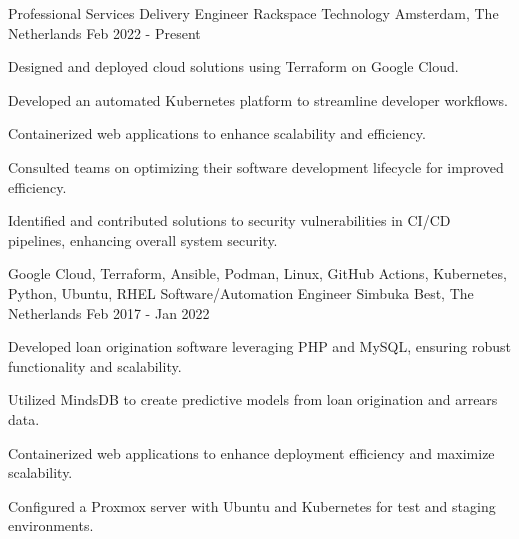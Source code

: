 

\begin{cventries}

  \cventry
    {Professional Services Delivery Engineer} %
    {Rackspace Technology} %
    {Amsterdam, The Netherlands} %
    {Feb 2022 - Present} %
    {
      \begin{cvitems} %
        \item {Designed and deployed cloud solutions using Terraform on Google Cloud.}
        \item {Developed an automated Kubernetes platform to streamline developer workflows.}
        \item {Containerized web applications to enhance scalability and efficiency.}
        \item {Consulted teams on optimizing their software development lifecycle for improved efficiency.}
        \item {Identified and contributed solutions to security vulnerabilities in CI/CD pipelines, enhancing overall system security.}
      \end{cvitems}
    }
    {Google Cloud, Terraform, Ansible, Podman, Linux, GitHub Actions, Kubernetes, Python, Ubuntu, RHEL}
  \cventry
    {Software/Automation Engineer} %
    {Simbuka} %
    {Best, The Netherlands} %
    {Feb 2017 - Jan 2022} %
    {
      \begin{cvitems} %
        \item {Developed loan origination software leveraging PHP and MySQL, ensuring robust functionality and scalability.}
        \item {Utilized MindsDB to create predictive models from loan origination and arrears data.}
        \item {Containerized web applications to enhance deployment efficiency and maximize scalability.}
        \item {Configured a Proxmox server with Ubuntu and Kubernetes for test and staging environments.}

\end{cvitems}}
\end{cventries}
